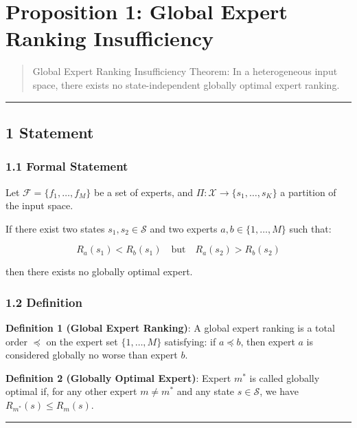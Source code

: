 \documentclass[
  12pt,
]{ctexart}
\author{SCX}
\date{2026}
\begin{document}
\section{Proposition 1: Global Expert Ranking
Insufficiency}\label{proposition-1-global-expert-ranking-insufficiency}

\begin{quote}
Global Expert Ranking Insufficiency Theorem: In a heterogeneous input space, there exists no state-independent globally optimal expert ranking.
\end{quote}

\begin{center}\rule{0.5\linewidth}{0.5pt}\end{center}

\subsection{1 Statement}\label{statement}

\subsubsection{1.1 Formal Statement}\label{formal-statement}

Let \(\mathcal{F} = \{f_1, \dots, f_M\}\)
be a set of experts, and \(\Pi: \mathcal{X} \to \{s_1, \dots, s_K\}\)
a partition of the input space.

If there exist two states \(s_1, s_2 \in \mathcal{S}\) and two experts
\(a, b \in \{1,\dots,M\}\) such that:

\[R_a(s_1) < R_b(s_1) \quad \text{but} \quad R_a(s_2) > R_b(s_2)\]

then there exists no globally optimal expert.

\subsubsection{1.2 Definition}\label{definition}

\textbf{Definition 1 (Global Expert Ranking)}: A global expert ranking is a total order \(\preceq\)
on the expert set \(\{1,\dots,M\}\) satisfying: if \(a \preceq b\), then expert
\(a\) is considered globally no worse than expert \(b\).

\textbf{Definition 2 (Globally Optimal Expert)}: Expert \(m^*\)
is called globally optimal if, for any other expert \(m \neq m^*\) and any state
\(s \in \mathcal{S}\), we have \(R_{m^*}(s) \leq R_m(s)\).

\begin{center}\rule{0.5\linewidth}{0.5pt}\end{center}
\end{document}
